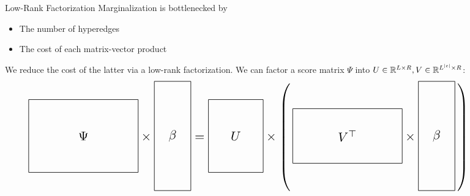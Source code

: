 \documentclass{beamer}
\newlength{\onecolwid}
\begin{document}
\begin{frame}
\begin{columns}[t]
\begin{column}{\onecolwid}
\begin{block}{Low-Rank Factorization}
Marginalization is bottlenecked by
\begin{itemize}
\item The number of hyperedges
\item The cost of each matrix-vector product
\end{itemize}
We reduce the cost of the latter via a low-rank factorization.
We can factor a score matrix $\Psi$ into 
$U\in\mathbb{R}^{L \times R},V\in\mathbb{R}^{L^{|e|}\times R}$:
\[
\scalebox{1.5}{
$
\vcenter{\hbox{\begin{tikzpicture}[baseline=-0.5ex]
    \draw (0,0) rectangle (3,2) node[pos=.5] {$\Psi$};
\end{tikzpicture}}}
\times
\vcenter{\hbox{\begin{tikzpicture}[baseline=-0.5ex]
    \draw (0,0) rectangle (1,3) node[pos=.5] {$\beta$};
\end{tikzpicture}}}
=
\vcenter{\hbox{\begin{tikzpicture}[baseline=-0.5ex]
    \draw (0,0) rectangle (1.5,2) node[pos=.5] {$U$};
\end{tikzpicture}}}
\times
\left(\,
\vcenter{\hbox{\begin{tikzpicture}[baseline=-0.5ex]
    \draw (0,0) rectangle (3,1.5) node[pos=.5] {$V^\top$};
\end{tikzpicture}}}
\times
\vcenter{\hbox{\begin{tikzpicture}[baseline=-0.5ex]
    \draw (0,0) rectangle (1,3) node[pos=.5] {$\beta$};
\end{tikzpicture}}}
\,\right)
$
}
\]

\end{block}


\end{column} %

\begin{column}{\onecolwid} %



\end{column}
\end{columns}
\end{frame}
\end{document}
